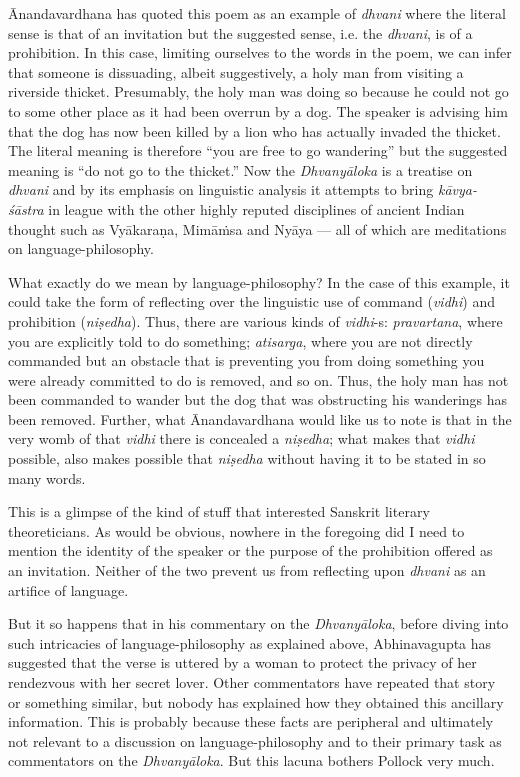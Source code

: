 Ānandavardhana has quoted this poem as an example of \textsl{dhvani} where the literal sense is that of an invitation but the suggested sense, i.e. the \textsl{dhvani}, is of a prohibition. In this case, limiting ourselves to the words in the poem, we can infer that someone is dissuading, albeit suggestively, a holy man from visiting a riverside thicket. Presumably, the holy man was doing so because he could not go to some other place as it had been overrun by a dog. The speaker is advising him that the dog has now been killed by a lion who has actually invaded the thicket. The literal meaning is therefore ``you are free to go wandering'' but the suggested meaning is ``do not go to the thicket.'' Now the \textsl{Dhvanyāloka} is a treatise on \textsl{dhvani} and by its emphasis on linguistic analysis it attempts to bring \textsl{kāvya-śāstra} in league with the other highly reputed disciplines of ancient Indian thought such as Vyākaraṇa, Mimāṁsa and Nyāya --- all of which are meditations on language-philosophy.

What exactly do we mean by language-philosophy? In the case of this example, it could take the form of reflecting over the linguistic use of command (\textsl{vidhi}) and prohibition (\textsl{niṣedha}). Thus, there are various kinds of \textsl{vidhi}-s: \textsl{pravartana}, where you are explicitly told to do something; \textsl{atisarga}, where you are not directly commanded but an obstacle that is preventing you from doing something you were already committed to do is removed, and so on. Thus, the holy man has not been commanded to wander but the dog that was obstructing his wanderings has been removed. Further, what Ānandavardhana would like us to note is that in the very womb of that \textsl{vidhi} there is concealed a \textsl{niṣedha}; what makes that \textsl{vidhi} possible, also makes possible that \textsl{niṣedha} without having it to be stated in so many words.

This is a glimpse of the kind of stuff that interested Sanskrit literary theoreticians. As would be obvious, nowhere in the foregoing did I need to mention the identity of the speaker or the purpose of the prohibition offered as an invitation. Neither of the two prevent us from reflecting upon \textsl{dhvani} as an artifice of language. 

But it so happens that in his commentary on the \textsl{Dhvanyāloka}, before diving into such intricacies of language-philosophy as explained above, Abhinavagupta has suggested that the verse is uttered by a woman to protect the privacy of her rendezvous with her secret lover. Other commentators have repeated that story or something similar, but nobody has explained how they obtained this ancillary information. This is probably because these facts are peripheral and ultimately not relevant to a discussion on language-philosophy and to their primary task as commentators on the \textsl{Dhvanyāloka}. But this lacuna bothers Pollock very much.

